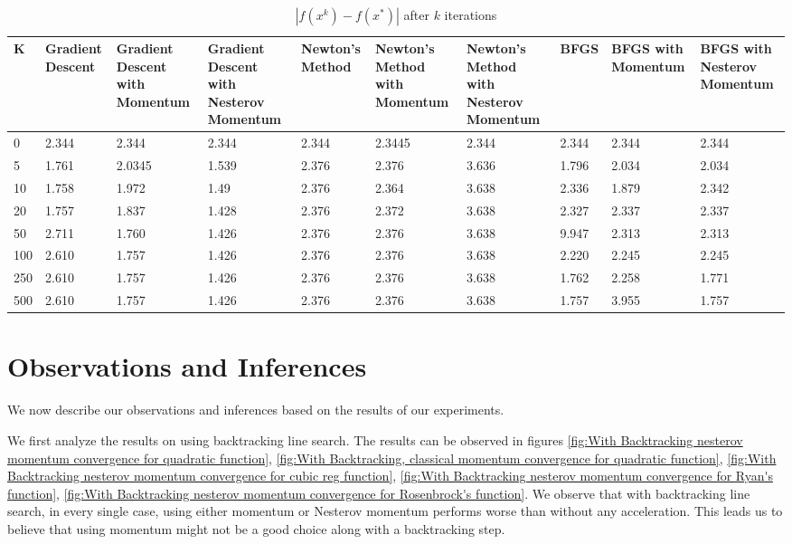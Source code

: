 \documentclass{article}
\begin{document}
\begin{center}
\begin{table}[H]
	\centering
	\caption{$ | f(x^k) - f(x^*) | $ after $k$ iterations}
	\label{Levy's function table}
	\begin{tabular}{|l|p{1.2cm}|p{1.2cm}|p{1.2cm}|p{1.2cm}|p{1.2cm}|p{1.2cm}|p{1.2cm}|p{1.2cm}|p{1.2cm}|}
		\hline
		K & Gradient Descent & Gradient Descent with Momentum & Gradient Descent with Nesterov Momentum & Newton's Method & Newton's Method with Momentum & Newton's Method with Nesterov Momentum & BFGS & BFGS with Momentum & BFGS with Nesterov Momentum \\
		\hline
		0 & 2.344 & 2.344 & 2.344 & 2.344 & 2.3445 & 2.344 & 2.344 & 2.344 & 2.344 \\
		\hline
		5 & 1.761 & 2.0345 & 1.539 & 2.376 & 2.376 & 3.636 & 1.796 & 2.034 & 2.034 \\
		\hline
		10 & 1.758 & 1.972 & 1.49 & 2.376 & 2.364 & 3.638 & 2.336 & 1.879 & 2.342 \\
		\hline
		20 & 1.757 & 1.837 & 1.428 & 2.376 & 2.372 & 3.638 & 2.327 & 2.337 & 2.337 \\
		\hline
		50 & 2.711 & 1.760 & 1.426 & 2.376 & 2.376 & 3.638 & 9.947 & 2.313 & 2.313 \\
		\hline
		100 & 2.610 & 1.757 & 1.426 & 2.376& 2.376 & 3.638 & 2.220 & 2.245 & 2.245 \\
		\hline
		250 & 2.610 & 1.757 & 1.426 & 2.376 & 2.376 & 3.638 & 1.762 & 2.258 & 1.771 \\
		\hline
		500 & 2.610 & 1.757 & 1.426 & 2.376 & 2.376 & 3.638 & 1.757 & 3.955 & 1.757 \\
		\hline
	\end{tabular}
\end{table}
\end{center}
\section{Observations and Inferences}\label{inferences}
We now describe our observations and inferences based on the results of our experiments.

We first analyze the results on using backtracking line search. The results can be observed in figures \ref{fig:With Backtracking nesterov momentum convergence for quadratic function}, \ref{fig:With Backtracking, classical momentum convergence for quadratic function},
\ref{fig:With Backtracking nesterov momentum convergence for cubic reg function},
\ref{fig:With Backtracking nesterov momentum convergence for Ryan's function},
\ref{fig:With Backtracking nesterov momentum convergence for Rosenbrock's function}. We observe that with backtracking line search, in every single case, using either momentum or Nesterov momentum performs worse than without any acceleration. This leads us to believe that using momentum might not be a good choice along with a backtracking step.
\end{document}
